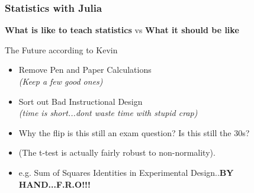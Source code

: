 \documentclass[Master.tex]{subfiles}
\begin{document}
\begin{frame}
	\frametitle{Statistics with Julia}
	\large
		\textbf{What is like to teach statistics }vs \textbf{What it should be like} \\ \smallskip
		
		
		The Future according to Kevin
	\begin{itemize}
		\item Remove Pen and Paper Calculations\\ \textit{(Keep a few good ones)}
		
		\item Sort out Bad Instructional Design \\ \textit{(time is short...dont waste time with stupid crap)}
		
		\item Why the flip is this still an exam question? Is this still the 30s?
		
		\item (The t-test is actually fairly robust to non-normality).
		
		\item e.g. Sum of Squares Identities in Experimental Design..\textbf{BY HAND...F.R.O!!!}
	\end{itemize}

\end{frame}	
\end{document}
